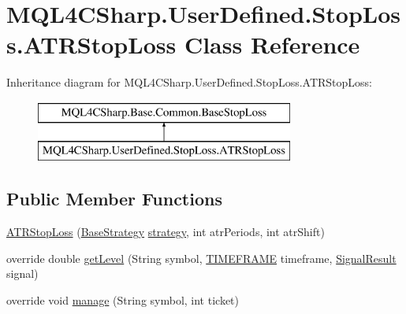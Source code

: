 \hypertarget{class_m_q_l4_c_sharp_1_1_user_defined_1_1_stop_loss_1_1_a_t_r_stop_loss}{}\section{M\+Q\+L4\+C\+Sharp.\+User\+Defined.\+Stop\+Loss.\+A\+T\+R\+Stop\+Loss Class Reference}
\label{class_m_q_l4_c_sharp_1_1_user_defined_1_1_stop_loss_1_1_a_t_r_stop_loss}
Inheritance diagram for M\+Q\+L4\+C\+Sharp.\+User\+Defined.\+Stop\+Loss.\+A\+T\+R\+Stop\+Loss\+:\begin{figure}[H]
\begin{center}
\leavevmode
\includegraphics[height=2.000000cm]{class_m_q_l4_c_sharp_1_1_user_defined_1_1_stop_loss_1_1_a_t_r_stop_loss}
\end{center}
\end{figure}
\subsection*{Public Member Functions}
\begin{DoxyCompactItemize}
\item 
\hyperlink{class_m_q_l4_c_sharp_1_1_user_defined_1_1_stop_loss_1_1_a_t_r_stop_loss_a981bbb0c4fb70c00cdecd3809ab13651}{A\+T\+R\+Stop\+Loss} (\hyperlink{class_m_q_l4_c_sharp_1_1_base_1_1_base_strategy}{Base\+Strategy} \hyperlink{class_m_q_l4_c_sharp_1_1_base_1_1_common_1_1_base_stop_loss_a8cbd2ea8e6ab4e5af253a32116905162}{strategy}, int atr\+Periods, int atr\+Shift)
\item 
override double \hyperlink{class_m_q_l4_c_sharp_1_1_user_defined_1_1_stop_loss_1_1_a_t_r_stop_loss_a86d3a1df0c8f545961ec5cb26b455623}{get\+Level} (String symbol, \hyperlink{namespace_m_q_l4_c_sharp_1_1_base_1_1_enums_a838810aaa87c63c12737408dba8c0b35}{T\+I\+M\+E\+F\+R\+A\+ME} timeframe, \hyperlink{class_m_q_l4_c_sharp_1_1_base_1_1_common_1_1_signal_result}{Signal\+Result} signal)
\item 
override void \hyperlink{class_m_q_l4_c_sharp_1_1_user_defined_1_1_stop_loss_1_1_a_t_r_stop_loss_ad7103e16e35e7297f08fadcda39481be}{manage} (String symbol, int ticket)
\end{DoxyCompactItemize}
